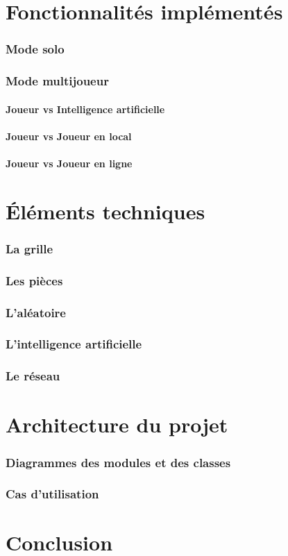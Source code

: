 \documentclass[]{report}
\begin{document}
\part{Fonctionnalités implémentés}
\section{Mode solo}
\section{Mode multijoueur}
\subsection{Joueur vs Intelligence artificielle}
\subsection{Joueur vs Joueur en local}
\subsection{Joueur vs Joueur en ligne}

\part{Éléments techniques}
\section{La grille}
\section{Les pièces}
\section{L'aléatoire}
\section{L'intelligence artificielle}
\section{Le réseau}

\part{Architecture du projet}
\section{Diagrammes des modules et des classes}
\section{Cas d'utilisation}

\part{Conclusion}
\end{document}
